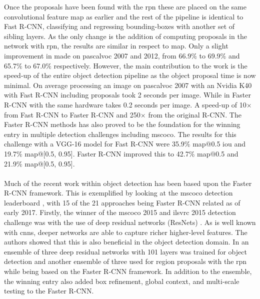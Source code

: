 Once the proposals have been found with the \gls{rpn} these are placed on the same convolutional feature map as earlier and the rest of the pipeline is identical to Fast R-CNN, classifying and regressing bounding-boxes with another set of sibling layers. As the only change is the addition of computing proposals in the network with \gls{rpn}, the results are similar in respect to \gls{map}. Only a slight improvement in made on \gls{pascalvoc} 2007 and 2012, from 66.9\% to 69.9\% and 65.7\% to 67.0\% respectively. However, the main contribution to the work is the speed-up of the entire object detection pipeline as the object proposal time is now minimal. On average processing an image on \gls{pascalvoc} 2007 with an Nvidia K40 with Fast R-CNN including proposals took 2 seconds per image. While in Faster R-CNN with the same hardware takes 0.2 seconds per image. A speed-up of 10$\times$ from Fast R-CNN to Faster R-CNN and 250$\times$ from the original R-CNN. The Faster R-CNN methods has also proved to be the foundation for the winning entry in multiple detection challenges including \gls{mscoco}. The results for this challenge with a VGG-16 model for Fast R-CNN were 35.9\% \gls{map}@0.5 \gls{iou} and 19.7\% \gls{map}@[0.5, 0.95]. Faster R-CNN improved this to 42.7\% \gls{map}@0.5 and 21.9\% \gls{map}@[0.5, 0.95].
\\\\
Much of the recent work within object detection has been based upon the Faster R-CNN framework. This is exemplified by looking at the \gls{mscoco} detection leaderboard \cite{cocolead}, with 15 of the 21 approaches being Faster R-CNN related as of early 2017. Firstly, the winner of the \gls{mscoco} 2015 and \gls{ilsvrc} 2015 detection challenge was with the use of deep residual networks (ResNets) \cite{deepres}. As is well known with \glspl{cnn}, deeper networks are able to capture richer higher-level features. The authors showed that this is also beneficial in the object detection domain. In \cite{deepres} an ensemble of three deep residual networks with 101 layers was trained for object detection and another ensemble of three used for region proposals with the \gls{rpn} while being based on the Faster R-CNN framework. In addition to the ensemble, the winning entry also added box refinement, global context, and multi-scale testing to the Faster R-CNN.
\\\\
